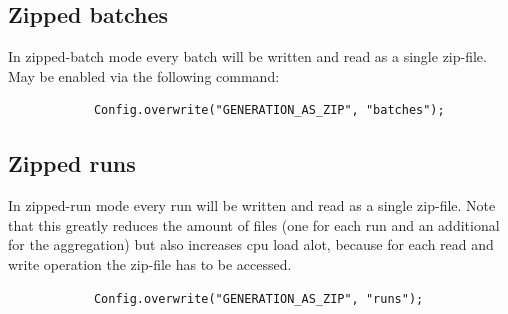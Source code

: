 \subsection{Zipped batches}
In zipped-batch mode every batch will be written and read as a single zip-file. May be enabled via the following command:
\begin{lstlisting}
			Config.overwrite("GENERATION_AS_ZIP", "batches");
\end{lstlisting}

\subsection{Zipped runs}
In zipped-run mode every run will be written and read as a single zip-file. Note that this greatly reduces the amount of files (one for each run and an additional for the aggregation) but also increases cpu load alot, because for each read and write operation the zip-file has to be accessed.
\begin{lstlisting}
			Config.overwrite("GENERATION_AS_ZIP", "runs");
\end{lstlisting}